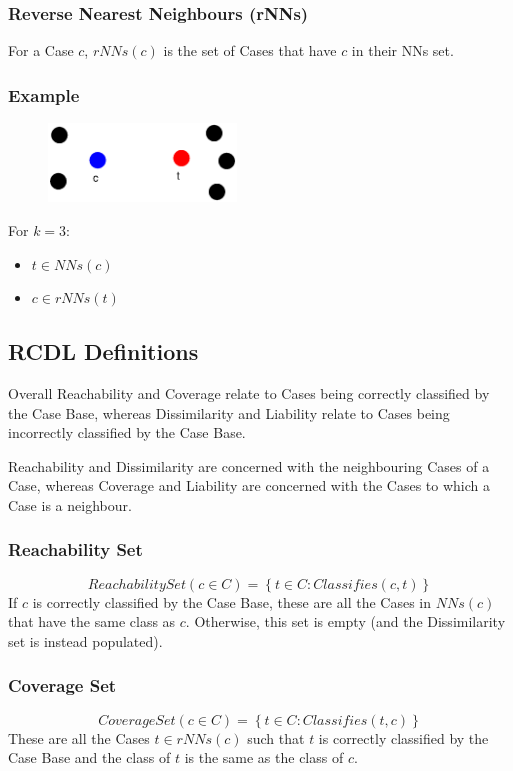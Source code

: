 \documentclass[a4paper,11pt]{report}
\begin{document}
\subsubsection{Reverse Nearest Neighbours (rNNs)}
For a Case $c$, $ rNNs(c) $ is the set of Cases that have $c$ in their NNs set.

\subsubsection{Example}
\begin{figure}[h!]
\includegraphics[width=5cm]{./Drawn/RcdlNnRnnEg}
\end{figure}

For $k=3$:
\begin{itemize}
	\item $ t \in NNs(c) $
	\item $ c \in rNNs(t) $
\end{itemize}

\subsection{RCDL Definitions}
Overall Reachability and Coverage relate to Cases being correctly classified by the Case Base, whereas Dissimilarity and Liability relate to Cases being incorrectly classified by the Case Base.

Reachability and Dissimilarity are concerned with the neighbouring Cases of a Case, whereas Coverage and Liability are concerned with the Cases to which a Case is a neighbour.

\subsubsection{Reachability Set}
\[ ReachabilitySet(c \in C) = \left\lbrace t \in C : Classifies(c, t) \right\rbrace \] 
If $c$ is correctly classified by the Case Base, these are all the Cases in $ NNs(c) $ that have the same class as $c$. Otherwise, this set is empty (and the Dissimilarity set is instead populated).

\subsubsection{Coverage Set}
\[ CoverageSet(c \in C) = \left\lbrace t \in C : Classifies(t, c) \right\rbrace \]
These are all the Cases $ t \in rNNs(c) $ such that $t$ is correctly classified by the Case Base and the class of $t$ is the same as the class of $c$.
\end{document}
